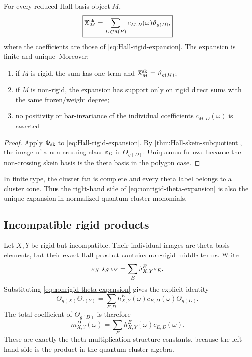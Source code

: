 \begin{theorem}
\label{thm:nonrigid-theta-expansion}
For every reduced Hall basis object $M$,
\begin{equation}
 \boxed{
 \mathbb X_M^{\rm sk}
 =\sum_{D\in\mathfrak N(P)}
    c_{M,D}(\omega)\vartheta_{g(D)},
 }
 \label{eq:nonrigid-theta-expansion}
\end{equation}
where the coefficients are those of
\eqref{eq:Hall-rigid-expansion}.  The expansion is finite and unique.
Moreover:
\begin{enumerate}[label=(\roman*),leftmargin=2.3em]
\item if $M$ is rigid, the sum has one term and
      $\mathbb X_M^{\rm sk}=\vartheta_{g(M)}$;
\item if $M$ is non-rigid, the expansion has support only on rigid direct sums
      with the same frozen/weight degree;
\item no positivity or bar-invariance of the individual coefficients
      $c_{M,D}(\omega)$ is asserted.
\end{enumerate}
\end{theorem}

\begin{proof}
Apply $\Phi_{\rm sk}$ to
\eqref{eq:Hall-rigid-expansion}.  By
\cref{thm:Hall-skein-subquotient}, the image of a non-crossing class $\varepsilon_D$
is $\Theta_{g(D)}$.  Uniqueness follows because the non-crossing skein basis is
the theta basis in the polygon case.
\end{proof}

In finite type, the cluster fan is complete and every theta label belongs to a
cluster cone.  Thus the right-hand side of
\eqref{eq:nonrigid-theta-expansion} is also the unique expansion in normalized
quantum cluster monomials.

\subsection{Incompatible rigid products}

Let $X,Y$ be rigid but incompatible.  Their individual images are theta basis
elements, but their exact Hall product contains non-rigid middle terms.  Write
\[
 \varepsilon_X\star_S\varepsilon_Y
 =\sum_E h_{X,Y}^E\varepsilon_E.
\]
Substituting \eqref{eq:nonrigid-theta-expansion} gives the explicit identity
\begin{equation}
 \Theta_{g(X)}\Theta_{g(Y)}
 =\sum_{E,D}
   h_{X,Y}^E(\omega)c_{E,D}(\omega)\Theta_{g(D)}.
 \label{eq:incompatible-theta-expansion}
\end{equation}
The total coefficient of $\Theta_{g(D)}$ is therefore
\begin{equation}
 m_{X,Y}^{D}(\omega)
 =\sum_E h_{X,Y}^E(\omega)c_{E,D}(\omega).
 \label{eq:theta-structure-from-Hall}
\end{equation}
These are exactly the theta multiplication structure constants, because the
left-hand side is the product in the quantum cluster algebra.

